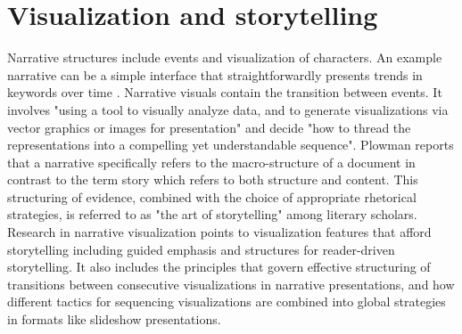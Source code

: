 \documentclass{egpubl}
\begin{document}
\section{Visualization and storytelling}
Narrative structures include events and visualization of characters. An example narrative can be a simple interface that straightforwardly presents trends in keywords over time \cite{fisher}. Narrative visuals contain the transition between events. It involves "using a tool to visually analyze data, and to generate visualizations via vector graphics or images for presentation" and decide "how to thread the representations into a compelling yet understandable sequence"\cite{hullman2013deeper}. Plowman \cite{plowman1999,eccles2007} reports that a narrative specifically refers to the macro-structure of a document in contrast to the term story which refers to both structure and content. This structuring of evidence, combined with the choice of appropriate rhetorical strategies, is referred to as "the art of storytelling" among literary scholars. Research in narrative visualization points to visualization features that afford storytelling including guided emphasis and structures for reader-driven storytelling. It also includes the principles that govern effective structuring of transitions
between consecutive visualizations in narrative presentations, and how different tactics for sequencing visualizations are combined into global strategies in formats like slideshow presentations.
\end{document}
